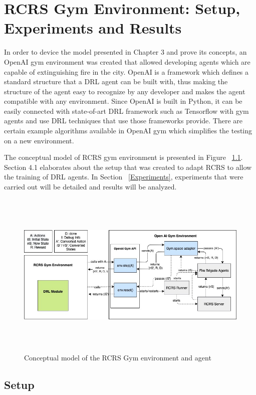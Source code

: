 \documentclass[12pt]{report}
\begin{document}
\chapter{RCRS Gym Environment: Setup, Experiments and Results}

In order to device the model presented in Chapter 3 and prove its concepts, an OpenAI gym environment \cite{brockman2016openai} was created that allowed developing agents which are capable of extinguishing fire in the city. OpenAI is a framework which defines a standard structure that a DRL agent can be built with, thus making the structure of the agent easy to recognize by any developer and makes the agent compatible with any environment. Since OpenAI is built in Python, it can be easily connected with state-of-art DRL framework such as Tensorflow \cite{Abadi} with gym agents and use DRL techniques that use those frameworks provide. There are certain example algorithms available in OpenAI gym which simplifies the testing on a new environment. 

The conceptual model of RCRS gym environment is presented in Figure ~\ref{fig:OpenAIgymRCRS}. Section 4.1 elaborates about the setup that was created to adapt RCRS to allow the training of DRL agents. In Section ~\ref{Experiments}, experiments that were carried out will be detailed and results will be analyzed. 

\begin{figure}[!h]
    \centering
    \includegraphics[height=8cm, width=17cm]{OpenAIGym.jpg}
    \caption{Conceptual model of the RCRS Gym environment and agent}
    \label{fig:OpenAIgymRCRS}
\end{figure}

\section{Setup} \label{Setup}
\end{document}
